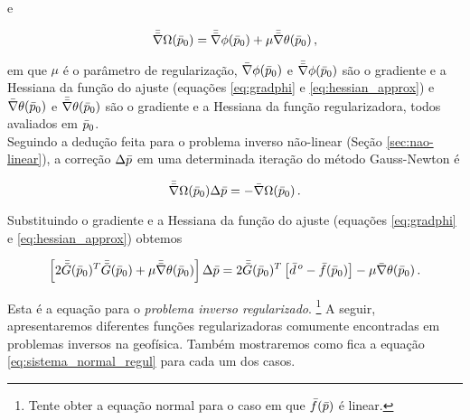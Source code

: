 \noindent e

\begin{equation}
\bar{\bar{\nabla}}\Omega(\bar{p}_0) = \bar{\bar{\nabla}}\phi(\bar{p}_0) +
    \mu\bar{\bar{\nabla}}\theta(\bar{p}_0) \thinspace ,
\label{eq:hessian_objetivo}
\end{equation}

\noindent em que $\mu$ é o parâmetro de regularização,
$\bar{\nabla}\phi(\bar{p}_0)$ e $\bar{\bar{\nabla}}\phi(\bar{p}_0)$
são o gradiente e a Hessiana da função do ajuste (equações \ref{eq:gradphi} e
\ref{eq:hessian_approx}) e
$\bar{\nabla}\theta(\bar{p}_0)$ e $\bar{\bar{\nabla}}\theta(\bar{p}_0)$ são o
gradiente e a Hessiana da função regularizadora, todos avaliados em $\bar{p}_0$.
\\
\indent Seguindo a dedução feita para o problema inverso não-linear (Seção
\ref{sec:nao-linear}), a correção $\Delta\bar{p}$ em uma determinada iteração
do método Gauss-Newton é

\begin{equation}
\bar{\bar{\nabla}}\Omega(\bar{p}_0)\Delta\bar{p} = -\bar{\nabla}\Omega(\bar{p}_0)
    \thinspace .
\label{eq:sistema_normal_objetivo}
\end{equation}

\noindent Substituindo o gradiente e a Hessiana da função do ajuste (equações
\ref{eq:gradphi} e \ref{eq:hessian_approx}) obtemos

\begin{equation}
\left[2\bar{\bar{G}}(\bar{p}_0)^T\bar{\bar{G}}(\bar{p}_0) +
      \mu\bar{\bar{\nabla}}\theta(\bar{p}_0)\right]\Delta\bar{p} =
2\bar{\bar{G}}(\bar{p}_0)^T \left[\bar{d}^{\thinspace o} - \bar{f}(\bar{p}_0)\right] -
\mu\bar{\nabla}\theta(\bar{p}_0)
    \thinspace .
\label{eq:sistema_normal_regul}
\end{equation}

\indent Esta é a equação para o {\it problema inverso regularizado}.
\footnote{Tente obter a equação normal para o caso em que $\bar{f}(\bar{p})$ é linear.}
A seguir, apresentaremos diferentes funções regularizadoras comumente encontradas
em problemas inversos na geofísica.
Também mostraremos como fica a equação \ref{eq:sistema_normal_regul} para cada
um dos casos.

